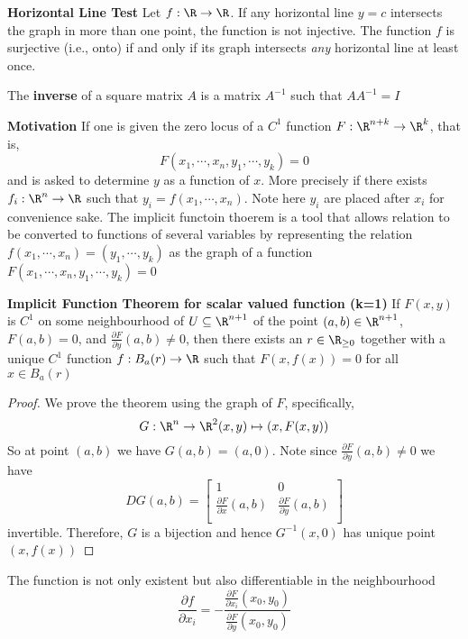\documentclass[11pt]{article}
\begin{document}
\begin{defn*}
  \textbf{Horizontal Line Test} Let $f: \R \to \R$. If any horizontal line $y=c$ intersects the graph in more than one point, the function is not injective. The function $f$ is surjective (i.e., onto) if and only if its graph intersects \textit{any} horizontal line at least once.
\end{defn*}



\begin{defn*}
  The \textbf{inverse} of a square matrix $A$ is a matrix $A^{-1}$ such that $A A^{-1} = I$
\end{defn*}

$ $\\
 \textbf{Motivation} If one is given the zero locus of a $C^1$ function $F:\R^{n+k} \to \R^k$, that is,
 \[
  F(x_1, \cdots, x_n, y_1, \cdots, y_k) = 0
 \]
 and is asked to determine $y$ as a function of $x$. More precisely if there exists $f_i:\R^n \to\R$ such that $y_i = f(x_1, \cdots, x_n)$. Note here $y_i$ are placed after $x_i$ for convenience sake. The implicit functoin thoerem is a tool that allows relation to be converted to functions of several variables by representing the relation $f(x_1, \cdots, x_n) = (y_1, \cdots, y_k)$ as the graph of a function $F(x_1, \cdots, x_n, y_1, \cdots, y_k) = 0$


\begin{theorem*}
  \textbf{Implicit Function Theorem for scalar valued function (k=1)} If $F(x,y)$ is $C^1$ on some neighbourhood of $U\subseteq \R^{n+1}$ of the point $(a,b)\in\R^{n+1}$, $F(a,b) = 0$, and $\frac{\partial F}{\partial y}(a,b) \neq 0$, then there exists an $r\in \R_{\geq 0}$ together with a unique $C^1$ function $f: B_a(r) \to \R$ such that $F(x, f(x))=0$ for all $x\in B_a(r)$
  \begin{proof}
    We prove the theorem using the graph of $F$, specifically,
    \[
      G:\R^n \to \R^2 (x,y) \mapsto (x, F(x,y))
    \]
    So at point $(a,b)$ we have $G(a,b) = (a, 0)$. Note since $\frac{\partial F}{\partial y} (a,b) \neq 0$ we have
    \[
      DG(a,b) =
      \begin{bmatrix}
        1 & 0 \\
        \frac{\partial F}{\partial x} (a,b) &   \frac{\partial F}{\partial y} (a,b) \\
      \end{bmatrix}
    \]
    invertible. Therefore, $G$ is a bijection and hence $G^{-1}(x, 0)$ has unique point $(x, f(x))$

  \end{proof}
  \begin{rem}
    The function is not only existent but also differentiable in the neighbourhood
    \[
      \frac{\partial f}{\partial x_i} = - \frac{\frac{\partial F}{\partial x_i} (x_0, y_0)}{\frac{\partial F}{\partial y} (x_0, y_0)}
    \]
  \end{rem}
\end{theorem*}
\end{document}
